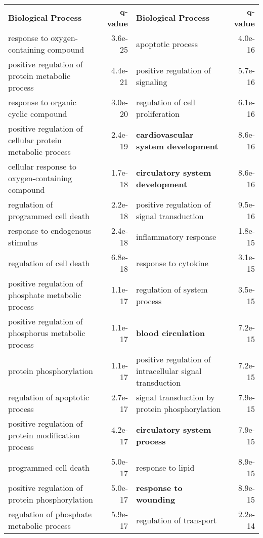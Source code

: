 \documentclass[fleqn,10pt]{SelfArx} %
\begin{document}
\begin{table}[ht]
	\centering
	\scriptsize
	\begin{tabularx}{\textwidth}{lRlR}
		\textbf{\color{white} Biological Process} & \textbf{\color{white} q-value} & \textbf{\color{white} Biological Process} & \textbf{\color{white} q-value}\\
		response to oxygen-containing compound & 3.6e-25 & apoptotic process & 4.0e-16 \\ 
		positive regulation of protein metabolic process & 4.4e-21 & positive regulation of signaling & 5.7e-16 \\ 
		response to organic cyclic compound & 3.0e-20 & regulation of cell proliferation & 6.1e-16 \\ 
		positive regulation of cellular protein metabolic process & 2.4e-19 & \textbf{cardiovascular system development} & 8.6e-16 \\ 
		cellular response to oxygen-containing compound & 1.7e-18 & \textbf{circulatory system development} & 8.6e-16 \\ 
		regulation of programmed cell death & 2.2e-18 & positive regulation of signal transduction & 9.5e-16 \\ 
		response to endogenous stimulus & 2.4e-18 & inflammatory response & 1.8e-15 \\ 
		regulation of cell death & 6.8e-18 & response to cytokine & 3.1e-15 \\ 
		positive regulation of phosphate metabolic process & 1.1e-17 & regulation of system process & 3.5e-15 \\ 
		positive regulation of phosphorus metabolic process & 1.1e-17 & \textbf{blood circulation} & 7.2e-15 \\ 
		protein phosphorylation & 1.1e-17 & positive regulation of intracellular signal transduction & 7.2e-15 \\ 
		regulation of apoptotic process & 2.7e-17 & signal transduction by protein phosphorylation & 7.9e-15 \\ 
		positive regulation of protein modification process & 4.2e-17 & \textbf{circulatory system process} & 7.9e-15 \\ 
		programmed cell death & 5.0e-17 & response to lipid & 8.9e-15 \\ 
		positive regulation of protein phosphorylation & 5.0e-17 & \textbf{response to wounding} & 8.9e-15 \\ 
		regulation of phosphate metabolic process & 5.9e-17 & regulation of transport & 2.2e-14 \\ 

\end{tabularx}
\end{table}
\end{document}
